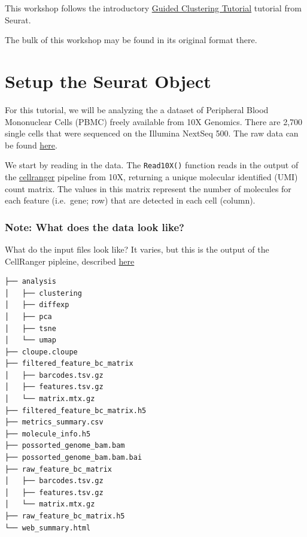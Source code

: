\documentclass[
]{book}
\begin{document}
This workshop follows the introductory \href{https://satijalab.org/seurat/articles/pbmc3k_tutorial.html}{Guided Clustering Tutorial} tutorial from Seurat.

The bulk of this workshop may be found in its original format there.

\section{Setup the Seurat Object}\label{setup-the-seurat-object}

For this tutorial, we will be analyzing the a dataset of Peripheral Blood Mononuclear Cells (PBMC) freely available from 10X Genomics. There are 2,700 single cells that were sequenced on the Illumina NextSeq 500. The raw data can be found \href{https://cf.10xgenomics.com/samples/cell/pbmc3k/pbmc3k_filtered_gene_bc_matrices.tar.gz}{here}.

We start by reading in the data. The \texttt{Read10X()} function reads in the output of the \href{https://support.10xgenomics.com/single-cell-gene-expression/software/pipelines/latest/what-is-cell-ranger}{cellranger} pipeline from 10X, returning a unique molecular identified (UMI) count matrix. The values in this matrix represent the number of molecules for each feature (i.e.~gene; row) that are detected in each cell (column).

\subsubsection*{Note: What does the data look like?}\label{note-what-does-the-data-look-like}

What do the input files look like? It varies, but this is the output of the CellRanger pipleine, described \href{https://support.10xgenomics.com/single-cell-gene-expression/software/pipelines/latest/output/gex-outputs}{here}

\begin{verbatim}
├── analysis
│   ├── clustering
│   ├── diffexp
│   ├── pca
│   ├── tsne
│   └── umap
├── cloupe.cloupe
├── filtered_feature_bc_matrix
│   ├── barcodes.tsv.gz
│   ├── features.tsv.gz
│   └── matrix.mtx.gz
├── filtered_feature_bc_matrix.h5
├── metrics_summary.csv
├── molecule_info.h5
├── possorted_genome_bam.bam
├── possorted_genome_bam.bam.bai
├── raw_feature_bc_matrix
│   ├── barcodes.tsv.gz
│   ├── features.tsv.gz
│   └── matrix.mtx.gz
├── raw_feature_bc_matrix.h5
└── web_summary.html
\end{verbatim}
\end{document}
